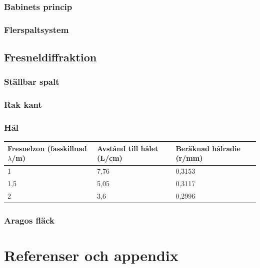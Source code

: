 \documentclass[a4paper]{article}
\begin{document}
\subsubsection{Babinets princip}
\subsubsection{Flerspaltsystem}
\subsection{Fresneldiffraktion}
\subsubsection{Ställbar spalt}
\subsubsection{Rak kant}
\subsubsection{Hål}
\begin{table}[h!]
	\begin{tabular}{|l|l|l|}
	\hline
	Fresnelzon (fasskillnad $\lambda$/m) & Avstånd till hålet (L/cm) & Beräknad hålradie (r/mm) \\ \hline
	1                                 & 7,76                      & 0,3153                   \\ \hline
	1,5                               & 5,05                      & 0,3117                   \\ \hline
	2                                 & 3,6                       & 0,2996                   \\ \hline
	\end{tabular}
	\end{table}
\subsubsection{Aragos fläck}
\section{Referenser och appendix}
\end{document}
